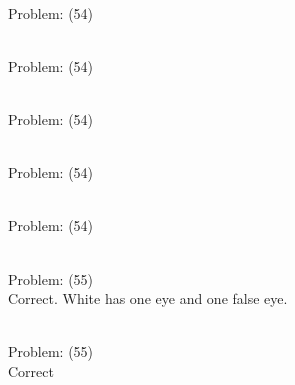 \documentclass[11pt]{article}
\begin{document}
\begin{minipage}[t]{0.5\textwidth}
  {\centering
  
\\
Problem: (54)\\
  }
\end{minipage}
\begin{minipage}[t]{0.5\textwidth}
  {\centering
  
\\
Problem: (54)\\
  }
\end{minipage}
\begin{minipage}[t]{0.5\textwidth}
  {\centering
  
\\
Problem: (54)\\
  }
\end{minipage}
\begin{minipage}[t]{0.5\textwidth}
  {\centering
  
\\
Problem: (54)\\
  }
\end{minipage}
\begin{minipage}[t]{0.5\textwidth}
  {\centering
  
\\
Problem: (54)\\
  }
\end{minipage}
\begin{minipage}[t]{0.5\textwidth}
  {\centering
  
\\
Problem: (55)\\
Correct. White has one eye and one false eye.\\
  }
\end{minipage}
\begin{minipage}[t]{0.5\textwidth}
  {\centering
  
\\
Problem: (55)\\
Correct\\
  }
\end{minipage}
\end{document}
